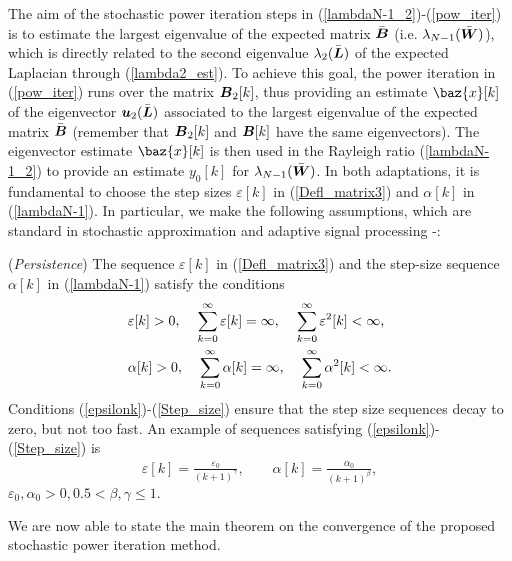 \documentclass[10pt,twocolumn]{IEEEtran}
\def\bB{\mbox{\boldmath $B$}}
\def\bL{\mbox{\boldmath $L$}}
\def\bW{\mbox{\boldmath $W$}}
\def\bu{\mbox{\boldmath $u$}}
\def\bx{\baz{x}}
\begin{document}
The aim of the stochastic power iteration steps in (\ref{lambdaN-1_2})-(\ref{pow_iter}) is to estimate the largest eigenvalue of the expected matrix $\bar{\bB}$ (i.e. $\lambda_{N-1}(\bar{\bW})$), which is directly related to the second eigenvalue $\lambda_2(\bar{\bL})$ of the expected Laplacian through (\ref{lambda2_est}). To achieve this goal, the power iteration in (\ref{pow_iter}) runs over the matrix $\bB_2[k]$, thus providing an estimate $\bx[k]$ of the eigenvector $\bu_2(\bar{\bL})$ associated to the largest eigenvalue of the expected matrix $\bar{\bB}$ (remember that $\bB_2[k]$ and $\bB[k]$ have the same eigenvectors).
The eigenvector estimate $\bx[k]$ is then used in the Rayleigh ratio (\ref{lambdaN-1_2}) to provide an estimate $y_0[k]$ for $\lambda_{N-1}(\bar{\bW})$.
In both adaptations, it is fundamental to choose the step sizes $\varepsilon[k]$ in (\ref{Defl_matrix3}) and $\alpha[k]$ in (\ref{lambdaN-1}).
In particular,  we make the following assumptions, which are standard in stochastic approximation and adaptive signal processing \cite{Sayed}-\cite{Nevel}:

 (\emph{Persistence}) The sequence $\varepsilon[k]$ in (\ref{Defl_matrix3}) and the step-size sequence $\alpha[k]$ in (\ref{lambdaN-1}) satisfy the conditions
\begin{align}
&\varepsilon[k]>0, \hspace{.4cm}  \sum_{k=0}^{\infty}\varepsilon[k]=\infty, \hspace{.4cm}   \sum_{k=0}^{\infty}\varepsilon^2[k]<\infty,\label{epsilonk}\\
&\alpha[k]>0, \hspace{.4cm}  \sum_{k=0}^{\infty}\alpha[k]=\infty, \hspace{.4cm}   \sum_{k=0}^{\infty}\alpha^2[k]<\infty.\label{Step_size}
\end{align}
Conditions (\ref{epsilonk})-(\ref{Step_size})  ensure that the step size sequences decay to zero, but not too fast. An example of sequences satisfying (\ref{epsilonk})-(\ref{Step_size}) is
\begin{eqnarray}\label{Step_size2}
\varepsilon[k]=\frac{\varepsilon_0}{(k+1)^{\gamma}}, \quad\quad \alpha[k]=\frac{\alpha_0}{(k+1)^{\beta}},
\end{eqnarray}
$\varepsilon_0,\alpha_0>0, 0.5<\beta,\gamma\leq1.$

\noindent We are now able to state the main theorem on the convergence of the proposed stochastic power iteration method.
\end{document}
